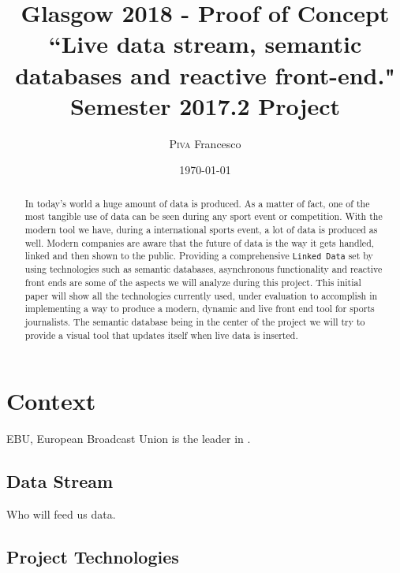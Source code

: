 \documentclass{article}
\title{\textbf{Glasgow 2018 - Proof of Concept \\ ``Live data stream, semantic databases and reactive front-end."}{ \\ Semester 2017.2 Project }} %
\author{\textsc{Piva} Francesco}
\date{\today} %
\begin{document}
\maketitle %
\begin{center}

\end{center}

\begin{abstract}
{ In today's world a huge amount of data is produced. As a matter of fact, one of the most tangible use of data can be seen during any sport event or competition. With the modern tool we have, during a international sports event, a lot of data is produced as well. Modern companies are aware that the future of data is the way it gets handled, linked and then shown to the public. Providing a comprehensive \texttt{Linked Data} set by using technologies such as semantic databases, asynchronous functionality and reactive front ends are some of the aspects we will analyze during this project. This initial paper will show all the technologies currently used, under evaluation to accomplish in implementing a way to produce a modern, dynamic and live front end tool for sports journalists. The semantic database being in the center of the project we will try to provide a visual tool that updates itself when live data is inserted. }
\end{abstract}

\newpage 

{\vspace*{.5cm}} \section{Context}

{EBU, European Broadcast Union is the leader in .}


\subsection{Data Stream}

{Who will feed us data.}


\subsection{Project Technologies}
\end{document}
